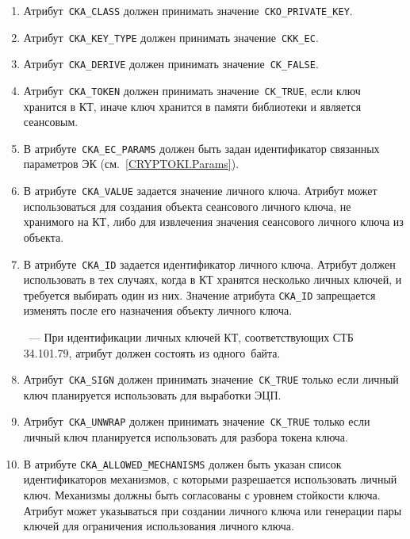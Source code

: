 \begin{enumerate}
\item
Атрибут~\verb|CKA_CLASS| должен принимать значение~\verb|CKO_PRIVATE_KEY|.

\item
Атрибут~\verb|CKA_KEY_TYPE| должен принимать значение~\verb|CKK_EC|.

\item
Атрибут~\verb|CKA_DERIVE| должен принимать значение~\verb|CK_FALSE|.

\item
Атрибут~\verb|CKA_TOKEN| должен принимать значение~\verb|CK_TRUE|,
если ключ хранится в КТ, иначе ключ хранится в памяти библиотеки и
является сеансовым.

\item
В атрибуте~\verb|CKA_EC_PARAMS| должен быть задан идентификатор связанных
параметров ЭК (см.~\ref{CRYPTOKI.Params}).

\item
В атрибуте~\verb|CKA_VALUE| задается значение личного ключа.
Атрибут может использоваться для создания объекта сеансового личного ключа,
не хранимого на КТ, либо для извлечения значения сеансового личного ключа
из объекта.

\item
В атрибуте~\verb|CKA_ID| задается идентификатор личного ключа.
Атрибут должен использовать в тех случаях, когда в КТ
хранятся несколько личных ключей, и требуется выбирать один из них. 
%
Значение атрибута \verb|CKA_ID| запрещается изменять
после его назначения объекту личного ключа.

\begin{note}
~---
При идентификации личных ключей КТ, соответствующих СТБ 34.101.79,
атрибут должен состоять из одного~байта.
\end{note}

\item
Атрибут~\verb|CKA_SIGN| должен принимать значение~\verb|CK_TRUE|
только если личный ключ планируется использовать для выработки ЭЦП.

\item
Атрибут~\verb|CKA_UNWRAP| должен принимать значение~\verb|CK_TRUE|
только если личный ключ планируется использовать для разбора
токена ключа.

\item
В атрибуте \verb|CKA_ALLOWED_MECHANISMS| должен быть указан список 
идентификаторов механизмов, с которыми разрешается использовать
личный ключ. Механизмы должны быть согласованы с уровнем стойкости 
ключа. Атрибут может указываться при создании личного
ключа или генерации пары ключей для ограничения использования
личного ключа. 


\end{enumerate}
